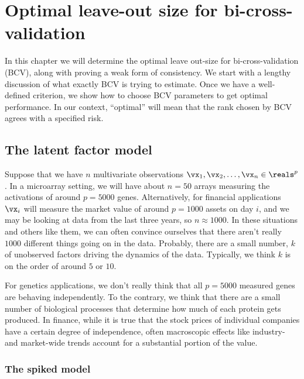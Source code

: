 \chapter[Optimal leave-out size for BCV]{Optimal leave-out size for bi-cross-validation}

In this chapter we will determine the optimal leave out-size for bi-cross-validation (BCV), along with proving a weak form of consistency.  We start with a lengthy discussion of what exactly BCV is trying to estimate.  Once we have a well-defined criterion, we show how to choose BCV parameters to get optimal performance.  In our context, ``optimal'' will mean that the rank chosen by BCV agrees with a specified risk.

\section{The latent factor model}

Suppose that we have $n$ multivariate observations $\vx_{1}, \vx_{2}, \ldots, \vx_{n} \in \reals^p$.  In a microarray setting, we will have about $n=50$ arrays measuring the activations of around $p=5000$ genes.  Alternatively, for financial applications $\vx_i$ will measure the market value of around $p=1000$ assets on day $i$, and we may be looking at data from the last three years, so $n \approx 1000$.  In these situations and others like them, we can often convince ourselves that there aren't really $1000$ different things going on in the data.  Probably, there are a small number, $k$ of unobserved factors driving the dynamics of the data.  Typically, we think $k$ is on the order of around $5$ or $10$.

For genetics applications, we don't really think that all $p=5000$ measured genes are behaving independently.  To the contrary, we think that there are a small number of biological processes that determine how much of each protein gets produced.  In finance, while it is true that the stock prices of individual companies have a certain degree of independence, often macroscopic effects like industry- and market-wide trends account for a substantial portion of the value.

\subsection{The spiked model}

